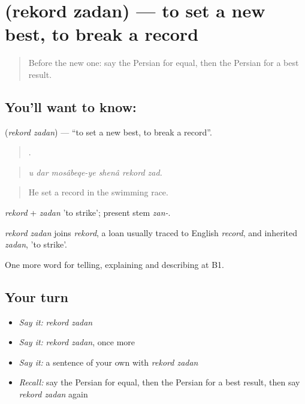 \section[\texorpdfstring{\fa{رکورد} \fa{زدن} (rekord zadan)}{رکورد زدن (rekord zadan)}]{  (rekord zadan) — to set a new best, to break a record}

\label{lesson:FA-C513-rekord-zadan}



\begin{quote}
Before the new one: say the Persian for equal, then the Persian for a best result.
\end{quote}

\subsection*{You'll want to know:  }
\textbf{ } (\emph{rekord zadan}) — \textquotedblleft{}to set a new best, to break a record\textquotedblright{}.

\begin{quote}
     .
\end{quote}

\begin{quote}
\emph{u dar mosâbeqe-ye shenâ rekord zad.}
\end{quote}

\begin{quote}
He set a record in the swimming race.
\end{quote}

\emph{rekord} + \emph{zadan} 'to strike'; present stem \emph{zan-}.

\begin{cousinweb}
\emph{rekord zadan} joins \emph{rekord}, a loan usually traced to English \emph{record}, and inherited \emph{zadan}, 'to strike'.
\end{cousinweb}

\begin{grammarlens}[title={What you've built}]
One more word for telling, explaining and describing at B1.
\end{grammarlens}

\subsection*{Your turn}
\begin{itemize}
\raggedright
  \item \emph{Say it:} \emph{rekord zadan}
  \item \emph{Say it:} \emph{rekord zadan}, once more
  \item \emph{Say it:} a sentence of your own with \emph{rekord zadan}
  \item \emph{Recall:} say the Persian for equal, then the Persian for a best result, then say \emph{rekord zadan} again
\end{itemize}

